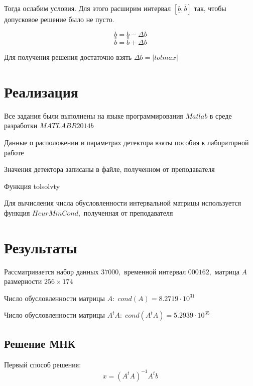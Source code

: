 \documentclass[a4]{article}
\begin{document}
Тогда ослабим условия. Для этого расширим интервал $[\underline b,\overline b]$ так, чтобы допусковое решение было не пусто.

$$\underline b =\underline b -\Delta b$$
$$\overline b = \overline b + \Delta b$$

Для получения решения достаточно взять $\Delta b = \vert tolmax\vert$





\section{Реализация}
Все задания были выполнены на языке программирования $Matlab$ в среде разработки $MATLAB R2014b$ \hfill \cite{1}

Данные о расположении и параметрах детектора взяты пособия к лабораторной работе \hfill\cite{source2}

Значения детектора записаны в файле, полученном от преподавателя

Функция tolsolvty \hfill \cite{tolsolvty}

Для вычисления числа обусловленности интервальной матрицы используется функция $HeurMinCond,$ полученная от преподавателя

\section{Результаты}

Рассматривается набор данных $37000,$ временной интервал $000162,$ матрица $A$ размерности $256\times 174$

Число обусловленности матрицы $A:\;cond(A)=8.2719\cdot 10^{31}$

Число обусловленности матрицы $A^tA:\;cond(A^tA)=5.2939\cdot 10^{35}$


\subsection{Решение МНК}
Первый способ решения:
$$x=(A^tA)^{-1}A^tb$$
\end{document}
